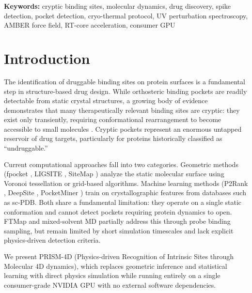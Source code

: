 \documentclass[11pt,twocolumn]{article}
\begin{document}
\textbf{Keywords:} cryptic binding sites, molecular dynamics, drug discovery, spike detection,
pocket detection, cryo-thermal protocol, UV perturbation spectroscopy, AMBER force field,
RT-core acceleration, consumer GPU

\section{Introduction}

The identification of druggable binding sites on protein surfaces is a fundamental step in
structure-based drug design. While orthosteric binding pockets are readily detectable from
static crystal structures, a growing body of evidence demonstrates that many therapeutically
relevant binding sites are cryptic: they exist only transiently, requiring conformational
rearrangement to become accessible to small molecules
\citep{cimermancic2016,vajda2018}. Cryptic pockets represent an enormous untapped
reservoir of drug targets, particularly for proteins historically classified as
``undruggable.''

Current computational approaches fall into two categories. Geometric methods (fpocket
\citep{leguilloux2009}, LIGSITE \citep{hendlich1997}, SiteMap \citep{halgren2009}) analyze the
static molecular surface using Voronoi tessellation or grid-based algorithms. Machine learning
methods (P2Rank \citep{krivak2018}, DeepSite \citep{jimenez2017}, PocketMiner
\citep{meller2023}) train on crystallographic features from databases such as sc-PDB. Both
share a fundamental limitation: they operate on a single static conformation and cannot detect
pockets requiring protein dynamics to open. FTMap \citep{kozakov2015} and mixed-solvent MD
\citep{ghanakota2016} partially address this through probe binding sampling, but remain
limited by short simulation timescales and lack explicit physics-driven detection criteria.

We present PRISM-4D (Physics-driven Recognition of Intrinsic Sites through Molecular 4D
dynamics), which replaces geometric inference and statistical learning with direct physics
simulation while running entirely on a single consumer-grade NVIDIA GPU with no external
software dependencies.

\end{document}
